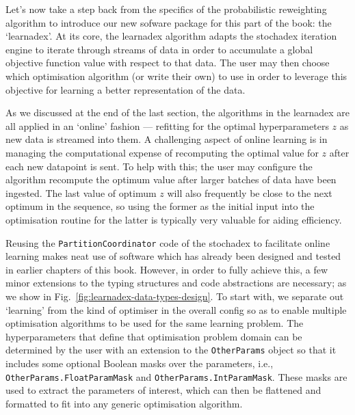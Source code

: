 Let's now take a step back from the specifics of the probabilistic reweighting algorithm to introduce our new sofware package for this part of the book: the `learnadex'. At its core, the learnadex algorithm adapts the stochadex iteration engine to iterate through streams of data in order to accumulate a global objective function value with respect to that data. The user may then choose which optimisation algorithm (or write their own) to use in order to leverage this objective for learning a better representation of the data. 

As we discussed at the end of the last section, the algorithms in the learnadex are all applied in an `online' fashion --- refitting for the optimal hyperparameters $z$ as new data is streamed into them. A challenging aspect of online learning is in managing the computational expense of recomputing the optimal value for $z$ after each new datapoint is sent. To help with this; the user may configure the algorithm recompute the optimum value after larger batches of data have been ingested. The last value of optimum $z$ will also frequently be close to the next optimum in the sequence, so using the former as the initial input into the optimisation routine for the latter is typically very valuable for aiding efficiency.

Reusing the \texttt{PartitionCoordinator} code of the stochadex to facilitate online learning makes neat use of software which has already been designed and tested in earlier chapters of this book. However, in order to fully achieve this, a few minor extensions to the typing structures and code abstractions are necessary; as we show in Fig.~\ref{fig:learnadex-data-types-design}. To start with, we separate out `learning' from the kind of optimiser in the overall config so as to enable multiple optimisation algorithms to be used for the same learning problem. The hyperparameters that define that optimisation problem domain can be determined by the user with an extension to the \texttt{OtherParams} object so that it includes some optional Boolean masks over the parameters, i.e., \texttt{OtherParams.FloatParamMask} and \texttt{OtherParams.IntParamMask}. These masks are used to extract the parameters of interest, which can then be flattened and formatted to fit into any generic optimisation algorithm.

